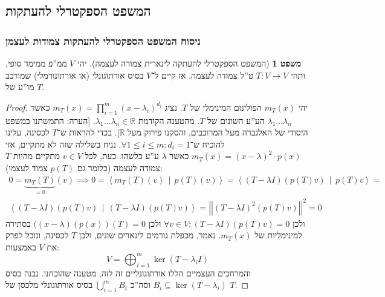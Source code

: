 \documentclass[a4paper]{article}
\newcommand\R     {\mathbb{R}}
\newcommand\ra    {\rangle}
\newcommand\la    {\langle}
\newcommand\co        {\colon}
\newcommand\norm[1]   {\left \vert \left \vert #1 \right \vert \right \vert}
\newcommand\mut [2]   {\left \la #1 \,\middle|\, #2 \right \ra}
\renewcommand\lg      {\lambda}
\theoremstyle{definition}
\newtheorem{Theorem}{\color{myblue}משפט}
\begin{document}
	\subsection{המשפט הספקטרלי להעתקות}
	\subsubsection{ניסוח המשפט הספקטרלי להעתקות צמודות לעצמן}
	
	\begin{Theorem}[המשפט הספקטרלי להעתקה לינארית צמודה לעצמה]
		יהי $V$ ממ''פ ממימד סופי, ותהי $T \co V \to V$ ט''ל צמודה לעצמה. אז קיים ל־$V$ בסיס אורתוגונלי (או אורתונורמלי) שמורכב מו''ע של $T$. 
	\end{Theorem} \begin{proof}
		יהי $m_T(x)$ הפולינום המינימלי של $T$. נציג $m_T(x) = \prod_{i = 1}^{m}(x - \lg_i)^{d_i}$ כאשר $\lg_1 \dots \lg_n$ הע''ע השונים של $T$. מהטענה הקודמת $\lg_1 \dots \lg_n \in \R$. [הערה: התמשתנו במשפט היסודי של האלגברה מעל המרוכבים, והסקנו פירוק מעל $\R$]. בכדי להראות ש־$T$ לכסינה, עלינו להוכיח ש־$\forall 1 \le i \le m \co d_i = 1$. נניח בשלילה שזה לא מתקיים, אזי $m_T(x) = (x - \lg)^2 \cdot p(x)$ כאשר $\lg$ ע''ע כלשהו. כעת, לכל $v \in V$ מתקיים מהיות $T$ צמודה לעצמה (כלומר גם $p(T)$ צמוד לעצמו): 
		\begin{multline*}
			0 = \underbrace{m_T(T)}_{=0}(v) \implies 0 = \mut{m_T(T)(v)}{p(T)(v)} = \mut{(T - \lg I)(p(T)v)}{p(T)v} =\\ \mut{(T - \lg I)(p(T)v)}{(T - \lg I)(p(T)v)} = \norm{(T - \lg I)^2(p(T)v)}^2 = 0
		\end{multline*}
		ולכן $\forall v \in V \co (T - \lg I)(p(T)v) = 0$ ולכן $((x - \lg)(p(x))(T) = 0$ בסתירה למינימליות של $m_T(x)$. נאמר, מכפלת גורמים לינארים שונים, ולכן $T$ לכסינה, ונוכל לפרק את $V$ באמצעות: 
		\[ V = \bigoplus_{i = 1}^{m} \ker (T - \lg_i I) \]
		והמרחכים העצמיים הללו אורתוגונליים זה לזה, מטענה שהוכחנו. 
		נבנה בסיס $B_i \subseteq \ker (T - \lg_i)$ וסה''כ $\bigcup_{i = 1}^{m} B_i$ בסיס אורתוגונלי מלכסן של $T$. 
	\end{proof}
\end{document}
